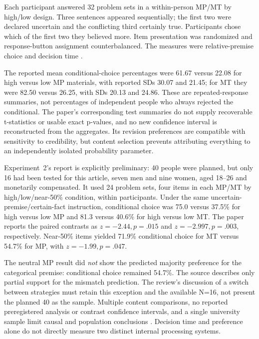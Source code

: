 Each participant answered 32 problem sets in a within-person
MP/MT by high/low design. Three sentences appeared sequentially; the
first two were declared uncertain and the conflicting third certainly
true. Participants chose which of the first two they believed more.
Item presentation was randomized and response-button assignment
counterbalanced. The measures were relative-premise choice and decision
time \cite[pp.~831--834]{WolfKnauff2008RevisionStrategy}.

The reported mean conditional-choice percentages were 61.67 versus 22.08
for high versus low MP materials, with reported SDs 30.07 and 21.45;
for MT they were 82.50 versus 26.25, with SDs 20.13 and 24.86.
These are repeated-response summaries, not percentages of independent
people who always rejected the conditional. The paper's corresponding
test summaries do not supply recoverable t-statistics or usable exact
p-values, and no new confidence interval is reconstructed from the
aggregates. Its revision preferences are compatible with sensitivity
to credibility, but content selection prevents attributing everything
to an independently isolated probability parameter.

Experiment~2's report is explicitly preliminary: 40 people were planned,
but only 16 had been tested for this article, seven men and nine women,
aged 18--26 and monetarily compensated. It used 24 problem sets, four
items in each MP/MT by high/low/near-50\% condition, within participants.
Under the same uncertain-premise/certain-fact instruction, conditional
choice was 75.0 versus 37.5\% for high versus low MP and 81.3 versus
40.6\% for high versus low MT. The paper reports the paired contrasts
as \(z=-2.44,p=.015\) and \(z=-2.997,p=.003\), respectively.
Near-50\% items yielded 71.9\% conditional choice for MT versus 54.7\%
for MP, with \(z=-1.99,p=.047\).

The neutral MP result did \emph{not} show the predicted majority
preference for the categorical premise: conditional choice remained
54.7\%. The source describes only partial support for the mismatch
prediction. The review's discussion of a switch between strategies must
retain this exception and the available N=16, not present the planned
40 as the sample. Multiple content comparisons, no reported preregistered
analysis or contrast confidence intervals, and a single university
sample limit causal and population conclusions
\cite[pp.~834--836]{WolfKnauff2008RevisionStrategy}.
Decision time and preference alone do not directly measure two distinct
internal processing systems.


